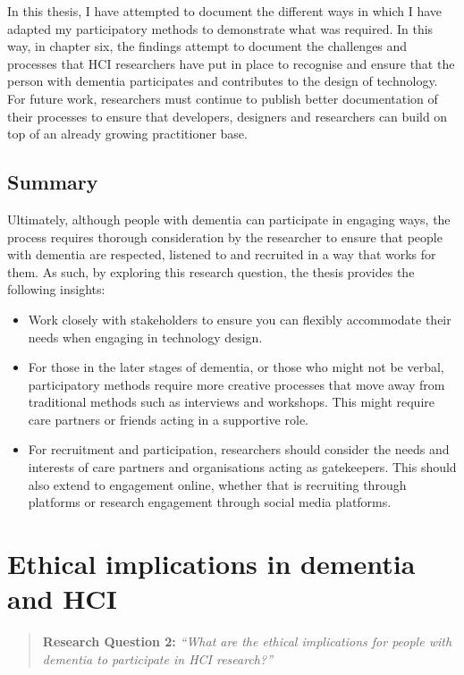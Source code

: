 In this thesis, I have attempted to document the different ways in which I have adapted my participatory methods to demonstrate what was required. In this way, in chapter six, the findings attempt to document the challenges and processes that HCI researchers have put in place to recognise and ensure that the person with dementia participates and contributes to the design of technology. For future work, researchers must continue to publish better documentation of their processes to ensure that developers, designers and researchers can build on top of an already growing practitioner base.

\subsection{Summary}
\label{RQ1:Summary}
Ultimately, although people with dementia can participate in engaging ways, the process requires thorough consideration by the researcher to ensure that people with dementia are respected, listened to and recruited in a way that works for them. As such, by exploring this research question, the thesis provides the following insights:

\begin{itemize}
    \item Work closely with stakeholders to ensure you can flexibly accommodate their needs when engaging in technology design.
    \item For those in the later stages of dementia, or those who might not be verbal, participatory methods require more creative processes that move away from traditional methods such as interviews and workshops. This might require care partners or friends acting in a supportive role.
    \item For recruitment and participation, researchers should consider the needs and interests of care partners and organisations acting as gatekeepers. This should also extend to engagement online, whether that is recruiting through platforms or research engagement through social media platforms. 
\end{itemize}

\section{Ethical implications in dementia and HCI}
\label{Discussion:RQ2}
\begin{quote}
\textbf{    Research Question 2:
}    
\textit{    “What are the ethical implications for people with dementia to participate in HCI research?”}
\end{quote}

